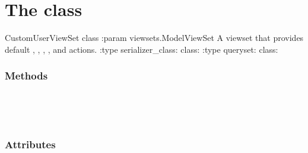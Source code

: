 \documentclass[letterpaper,10pt,english]{sphinxmanual}
\begin{document}
\section{The  class}
\label{\detokenize{vtcvlp:the-customuserviewset-class}}

\begin{fulllineitems}
\label{\detokenize{vtcvlp:vtcuser.api.CustomUserViewSet}}
CustomUserViewSet class
:param viewsets.ModelViewSet A viewset that provides default , , , ,  and  actions.
:type serializer\_class: class: 
:type queryset: class: 
\subsubsection*{Methods}


\begin{savenotes}\sphinxatlongtablestart\begin{longtable}[c]{}
\hline

\endfirsthead

%
{}\\
\hline

\endhead

\hline
{}\\
\endfoot

\endlastfoot

\end{longtable}\sphinxatlongtableend\end{savenotes}
\subsubsection*{Attributes}


\begin{savenotes}\sphinxatlongtablestart\begin{longtable}[c]{}
\hline


\end{longtable}
\end{savenotes}
\end{fulllineitems}
\end{document}
